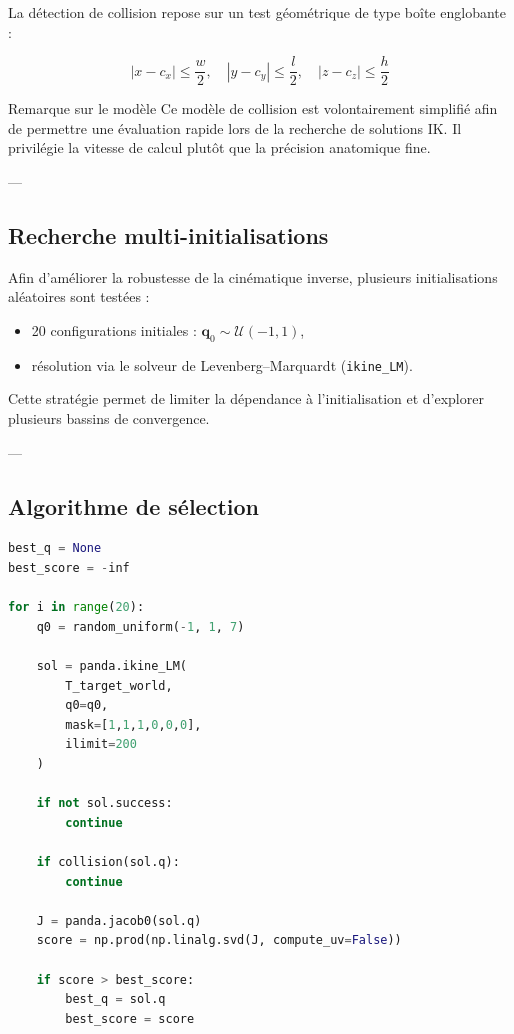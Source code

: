 \documentclass[11pt, a4paper]{article}
\begin{document}
La détection de collision repose sur un test géométrique de type boîte englobante :

\begin{equation}
|x - c_x| \leq \frac{w}{2}, \quad
|y - c_y| \leq \frac{l}{2}, \quad
|z - c_z| \leq \frac{h}{2}
\end{equation}

\begin{warnbox}{Remarque sur le modèle}
Ce modèle de collision est volontairement simplifié afin de permettre une évaluation rapide lors de la recherche de solutions IK.  
Il privilégie la vitesse de calcul plutôt que la précision anatomique fine.
\end{warnbox}

---

\subsection{Recherche multi-initialisations}

Afin d’améliorer la robustesse de la cinématique inverse, plusieurs initialisations aléatoires sont testées :

\begin{itemize}
  \item 20 configurations initiales : $\mathbf{q}_0 \sim \mathcal{U}(-1,1)$,
  \item résolution via le solveur de Levenberg–Marquardt (\texttt{ikine\_LM}).
\end{itemize}

Cette stratégie permet de limiter la dépendance à l’initialisation et d’explorer plusieurs bassins de convergence.

---

\subsection{Algorithme de sélection}

\begin{lstlisting}[language=python, caption={IK avec collision et multi-start}]
best_q = None
best_score = -inf

for i in range(20):
    q0 = random_uniform(-1, 1, 7)

    sol = panda.ikine_LM(
        T_target_world,
        q0=q0,
        mask=[1,1,1,0,0,0],
        ilimit=200
    )

    if not sol.success:
        continue

    if collision(sol.q):
        continue

    J = panda.jacob0(sol.q)
    score = np.prod(np.linalg.svd(J, compute_uv=False))

    if score > best_score:
        best_q = sol.q
        best_score = score
\end{lstlisting}
\end{document}
